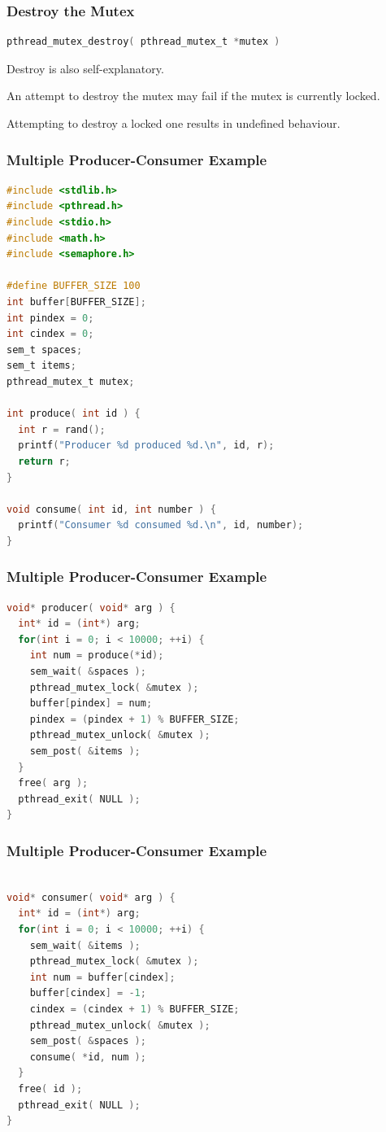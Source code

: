 \begin{frame}[fragile]
	\frametitle{Destroy the Mutex}

	\begin{lstlisting}[language=C]
pthread_mutex_destroy( pthread_mutex_t *mutex )
\end{lstlisting}

	Destroy is also self-explanatory.

	An attempt to destroy the mutex may fail if the mutex is currently locked.

	Attempting to destroy a locked one results in undefined behaviour.

\end{frame}


\begin{frame}[fragile]
	\frametitle{Multiple Producer-Consumer Example}
	\begin{lstlisting}[language=C]
#include <stdlib.h>
#include <pthread.h>
#include <stdio.h>
#include <math.h>
#include <semaphore.h>

#define BUFFER_SIZE 100
int buffer[BUFFER_SIZE];
int pindex = 0;
int cindex = 0;
sem_t spaces;
sem_t items;
pthread_mutex_t mutex;

int produce( int id ) {
  int r = rand();
  printf("Producer %d produced %d.\n", id, r);
  return r;
}

void consume( int id, int number ) {
  printf("Consumer %d consumed %d.\n", id, number);
}
\end{lstlisting}
\end{frame}

\begin{frame}[fragile]
	\frametitle{Multiple Producer-Consumer Example}
	\begin{lstlisting}[language=C]
void* producer( void* arg ) {
  int* id = (int*) arg;
  for(int i = 0; i < 10000; ++i) {
    int num = produce(*id); 
    sem_wait( &spaces );
    pthread_mutex_lock( &mutex );
    buffer[pindex] = num;
    pindex = (pindex + 1) % BUFFER_SIZE;
    pthread_mutex_unlock( &mutex );
    sem_post( &items );
  }
  free( arg );
  pthread_exit( NULL );
}
\end{lstlisting}
\end{frame}

\begin{frame}[fragile]
	\frametitle{Multiple Producer-Consumer Example}
	\begin{lstlisting}[language=C]

void* consumer( void* arg ) {
  int* id = (int*) arg;
  for(int i = 0; i < 10000; ++i) {
    sem_wait( &items );
    pthread_mutex_lock( &mutex );
    int num = buffer[cindex];
    buffer[cindex] = -1;
    cindex = (cindex + 1) % BUFFER_SIZE;
    pthread_mutex_unlock( &mutex );
    sem_post( &spaces );
    consume( *id, num );
  }
  free( id );
  pthread_exit( NULL );
}
\end{lstlisting}
\end{frame}

